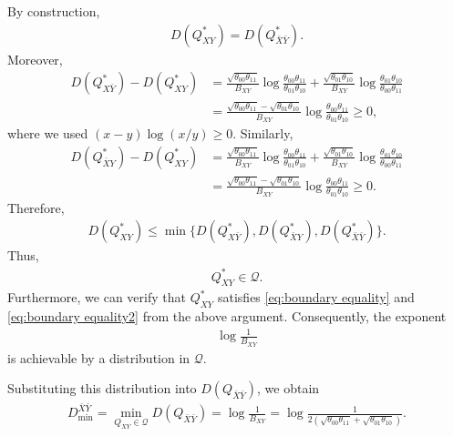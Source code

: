 \documentclass[journal,onecolumn]{IEEEtran}
\theoremstyle{definition}
\theoremstyle{remark}
\newcommand{\Dbxby}{D({Q_{\bar{X}\bar{Y}}})}
\newcommand{\Qxy}{Q_{XY}}
\newcommand{\Qxby}{Q_{X\bar{Y}}}
\newcommand{\Qbxy}{Q_{\bar{X}Y}}
\newcommand{\Qbxby}{Q_{\bar{X}\bar{Y}}}
\newcommand{\Dxyas}{D(\Qxy^*)}
\newcommand{\Dxbyas}{D(\Qxby^*)}
\newcommand{\Dbxyas}{D(\Qbxy^*)}
\newcommand{\Dbxbyas}{D(\Qbxby^*)}
\newcommand{\Dbxbymin}{D^{\bar{X}\bar{Y}}_\mathrm{min}}
\begin{document}
    By construction,
    \begin{align*}
        \Dxyas=\Dbxbyas.
    \end{align*}
    Moreover,
    \begin{align*}
        \Dxbyas-\Dxyas
        &=
        \frac{\sqrt{\theta_{00}\theta_{11}}}{B_{XY}}
        \log\frac{\theta_{00}\theta_{11}}{\theta_{01}\theta_{10}}
        +
        \frac{\sqrt{\theta_{01}\theta_{10}}}{B_{XY}}
        \log\frac{\theta_{01}\theta_{10}}{\theta_{00}\theta_{11}}
        \\
        &=
        \frac{
            \sqrt{\theta_{00}\theta_{11}}
            -
            \sqrt{\theta_{01}\theta_{10}}
        }{
            B_{XY}
        }
        \log
        \frac{\theta_{00}\theta_{11}}{\theta_{01}\theta_{10}}
        \geq 0,
    \end{align*}
    where we used $(x-y)\log(x/y)\geq 0$.  Similarly,
    \begin{align*}
        \Dbxyas-\Dxyas
        &=
        \frac{\sqrt{\theta_{00}\theta_{11}}}{B_{XY}}
        \log\frac{\theta_{00}\theta_{11}}{\theta_{01}\theta_{10}}
        +
        \frac{\sqrt{\theta_{01}\theta_{10}}}{B_{XY}}
        \log\frac{\theta_{01}\theta_{10}}{\theta_{00}\theta_{11}}
        \\
        &=
        \frac{
            \sqrt{\theta_{00}\theta_{11}}
            -
            \sqrt{\theta_{01}\theta_{10}}
        }{
            B_{XY}
        }
        \log
        \frac{\theta_{00}\theta_{11}}{\theta_{01}\theta_{10}}
        \geq 0.
    \end{align*}
    Therefore,
    \begin{align*}
        \Dxyas
        \leq
        \min\{\Dxbyas,\Dbxyas,\Dbxbyas\}.
    \end{align*}
    Thus,
    \begin{align*}
        \Qxy^\ast\in\mathcal{Q}.
    \end{align*}
    Furthermore, we can verify that $Q_{XY}^*$ satisfies \eqref{eq:boundary equality} and \eqref{eq:boundary equality2} from the above argument.
    Consequently, the exponent
    \begin{align*}
        \log\frac{1}{B_{XY}}
    \end{align*}
    is achievable by a distribution in $\mathcal{Q}$.

    Substituting this distribution into $\Dbxby$, we obtain
    \begin{align*}
        \Dbxbymin
        =
        \min_{\Qxy\in\mathcal{Q}} \Dbxby
        =
        \log\frac{1}{B_{XY}}
        =
        \log
        \frac{1}{
            2\left(
                \sqrt{\theta_{00}\theta_{11}}
                +
                \sqrt{\theta_{01}\theta_{10}}
            \right)
        }.
    \end{align*}
\end{document}
